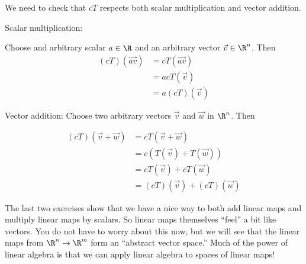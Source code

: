 \documentclass{ximera}
\begin{document}
\begin{free-response}
We need to check that $cT$ respects both scalar multiplication and vector addition.
 
 Scalar multiplication:
 
 Choose and arbitrary scalar $a \in \R$ and an arbitrary vector $\vec{v} \in \R^n$.  Then
 	\begin{align*}
 		(cT)(\vec{av}) &= cT(\vec{av})\\
 		&= acT(\vec{v})\\
 		&=a(cT)(\vec{v})
 	\end{align*}
 	
 	Vector addition:
 	Choose two arbitrary vectors $\vec{v}$ and $\vec{w}$ in $\R^n$.  Then
 	
 	\begin{align*}
 		(cT)(\vec{v}+\vec{w}) &= cT(\vec{v}+\vec{w})\\
 		&= c\left(T(\vec{v})+T(\vec{w})\right)\\
 		&=cT(\vec{v})+cT(\vec{w})\\
 		&=(cT)(\vec{v})+(cT)(\vec{w})
 	\end{align*}
\end{free-response}


\begin{observation}
  The last two exercises show that we have a nice way to both add
  linear maps and multiply linear maps by scalars.  So linear maps
  themselves ``feel'' a bit like vectors.  You do not have to worry
  about this now, but we will see that the linear maps from $\R^n \to
  \R^m$ form an ``abstract vector space.''  Much of the power of
  linear algebra is that we can apply linear algebra to spaces of
  linear maps!
\end{observation}
	
\end{document}
